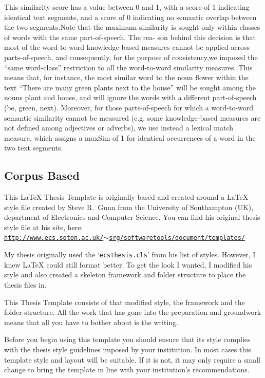   This similarity score has a value between 0 and 1, with a score of 1 indicating identical text segments, and a score of 0 indicating no semantic overlap between the two segments.Note that the maximum similarity is sought only within classes of words with the same part-of-speech. The rea-
son behind this decision is that most of the word-to-word knowledge-based measures cannot be applied across parts-of-speech, and consequently, for the purpose of consistency,we imposed the “same word-class” restriction to all the word-to-word similarity measures. This means that, for instance, the most similar word to the noun flower within the text “There are many green plants next to the house” will be sought among the nouns plant and house, and will ignore the words with a different part-of-speech (be, green, next). Moreover, for those parts-of-speech for which a word-to-word semantic similarity cannot be measured (e.g. some knowledge-based measures are not defined among adjectives or adverbs), we use instead a lexical match measure,
which assigns a maxSim of 1 for identical occurrences of a word in the two text segments.


\subsection{Corpus Based}

This \LaTeX{} Thesis Template is originally based and created around a \LaTeX{} style file created by Steve R.\ Gunn from the University of Southampton (UK), department of Electronics and Computer Science. You can find his original thesis style file at his site, here:\\
\href{http://www.ecs.soton.ac.uk/~srg/softwaretools/document/templates/}{\texttt{http://www.ecs.soton.ac.uk/$\sim$srg/softwaretools/document/templates/}}

My thesis originally used the `\texttt{ecsthesis.cls}' from his list of styles. However, I knew \LaTeX{} could still format better. To get the look I wanted, I modified his style and also created a skeleton framework and folder structure to place the thesis files in.

This Thesis Template consists of that modified style, the framework and the folder structure. All the work that has gone into the preparation and groundwork means that all you have to bother about is the writing.

Before you begin using this template you should ensure that its style complies with the thesis style guidelines imposed by your institution. In most cases this template style and layout will be suitable. If it is not, it may only require a small change to bring the template in line with your institution's recommendations.


